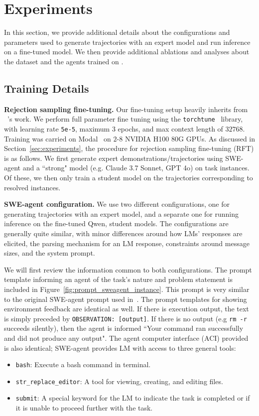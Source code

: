 \section{Experiments}
\label{appx:experiments}
In this section, we provide additional details about the configurations and parameters used to generate trajectories with an expert model and run inference on a fine-tuned model.
We then provide additional ablations and analyses about the \bugs{} dataset and the agents trained on \bugs{}.

\subsection{Training Details}
\label{appx:experiments:train_details}

\textbf{Rejection sampling fine-tuning.} Our fine-tuning setup heavily inherits from ~\citet{pan_training_2024}'s work.
We perform full parameter fine tuning using the \texttt{torchtune}~\citep{torchtune} library, with learning rate \texttt{5e-5}, maximum $3$ epochs, and max context length of $32768$.
Training was carried on Modal~\citep{modal} on $2$-$8$ NVIDIA H100 80G GPUs.
As discussed in Section~\ref{sec:experiments}, the procedure for rejection sampling fine-tuning (RFT) is as follows.
We first generate expert demonstrations/trajectories using SWE-agent and a ``strong" model (e.g. Claude 3.7 Sonnet, GPT 4o) on \bugs{} task instances.
Of these, we then only train a student model on the trajectories corresponding to resolved instances.

\textbf{SWE-agent configuration.}
We use two different configurations, one for generating trajectories with an expert model, and a separate one for running inference on the fine-tuned Qwen, student models.
The configurations are generally quite similar, with minor differences around how LMs' responses are elicited, the parsing mechanism for an LM response, constraints around message sizes, and the system prompt.

We will first review the information common to both configurations.
The prompt template informing an agent of the task's nature and problem statement is included in Figure~\ref{fig:prompt_sweagent_instance}.
This prompt is very similar to the original SWE-agent prompt used in~\citet{yang_swe-agent_2024}.
The prompt templates for showing environment feedback are identical as well.
If there is execution output, the text is simply preceded by \texttt{OBSERVATION: [output]}.
If there is no output (e.g \texttt{rm -r} succeeds silently), then the agent is informed ``Your command ran successfully and did not produce any output".
The agent computer interface (ACI) provided is also identical; SWE-agent provides LM with access to three general tools:
\begin{itemize}[noitemsep]
    \item \texttt{bash}: Execute a bash command in terminal.
    \item \texttt{str\_replace\_editor}: A tool for viewing, creating, and editing files.
    \item \texttt{submit}: A special keyword for the LM to indicate the task is completed or if it is unable to proceed further with the task.
\end{itemize}

